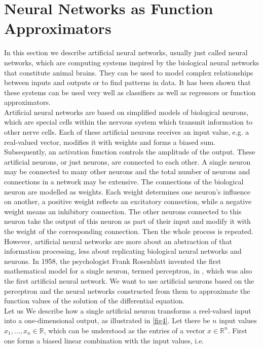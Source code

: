 \section{Neural Networks as Function Approximators}
\label{ch1:sec3}

In this section we describe artificial neural networks, usually just called neural networks, which are computing systems inspired by the biological neural networks that constitute animal brains. They can be used to model complex relationships between inputs and outputs or to find patterns in data. It has been shown that these systems can be used very well as classifiers as well as regressors or function approximators. \\
Artificial neural networks are based on simplified models of biological neurons, which are special cells within the nervous system which transmit information to other nerve cells. Each of these artificial neurons receives an input value, e.g. a real-valued vector, modifies it with weights and forms a biased sum. Subsequently, an activation function controls the amplitude of the output. These artificial neurons, or just neurons, are connected to each other. A single neuron may be connected to many other neurons and the total number of neurons and connections in a network may be extensive. The connections of the biological neuron are modelled as weights. Each weight determines one neuron's influence on another, a positive weight reflects an excitatory connection, while a negative weight means an inhibitory connection. The other neurons connected to this neuron take the output of this neuron as part of their input and modify it with the weight of the corresponding connection. Then the whole process is repeated. \\
However, artificial neural networks are more about an abstraction of that information processing, less about replicating biological neural networks and neurons. In 1958, the psychologist Frank Rosenblatt invented the first mathematical model for a single neuron, termed perceptron, in \cite{Rosenblatt:1958}, which was also the first artificial neural network. We want to use artificial neurons based on the perceptron and the neural networks constructed from them to approximate the function values of the solution of the differential equation.  \\
Let us We describe how a single artificial neuron transforms a reel-valued input into a one-dimensional output, as illustrated in \cref{fig4}. Let there be $n$ input values $x_1, \ldots, x_n \in \mathbb{R}$, which can be understood as the entries of a vector $x \in \mathbb{R}^n$. First one forms a biased linear combination with the input values, i.e. 
